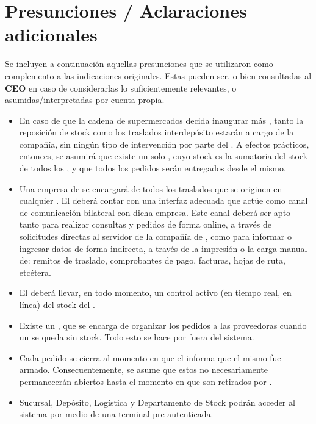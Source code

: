 
\section{Presunciones / Aclaraciones adicionales}

Se incluyen a continuación aquellas presunciones que se utilizaron como
complemento a las indicaciones originales. Estas pueden ser, o bien consultadas
al \textbf{CEO} en caso de considerarlas lo suficientemente relevantes, o
asumidas/interpretadas por cuenta propia.

\begin{itemize}

  \item En caso de que la cadena de supermercados decida inaugurar más
\textbf{}, tanto la reposición de stock como los traslados
interdepósito estarán a cargo de la compañía, sin ningún tipo de intervención
por parte del \textbf{}. A efectos prácticos, entonces, se asumirá
que existe un solo \textbf{}, cuyo stock es la sumatoria del stock
de todos los \textbf{}, y que todos los pedidos serán entregados
desde el mismo.

  \item Una empresa de \textbf{} se encargará de todos los
traslados que se originen en cualquier \textbf{}. El
\textbf{} deberá contar con una interfaz adecuada que actúe como
canal de comunicación bilateral con dicha empresa. Este canal deberá ser apto
tanto para realizar consultas y pedidos de forma online, a través de solicitudes
directas al servidor de la compañía de \textbf{}, como para
informar o ingresar datos de forma indirecta, a través de la impresión o la
carga manual de: remitos de traslado, comprobantes de pago, facturas, hojas de
ruta, etcétera.

  \item El \textbf{} deberá llevar, en todo momento, un control
activo (en tiempo real, en línea) del stock del \textbf{}.

  \item Existe un \textbf{}, que se encarga de
organizar los pedidos a las proveedoras cuando un \textbf{} se
queda sin stock. Todo esto se hace por fuera del sistema.

  \item Cada pedido se cierra al momento en que el \textbf{}
informa que el mismo fue armado. Consecuentemente, se asume que estos no
necesariamente permanecerán abiertos hasta el momento en que son retirados por
\textbf{}.

  \item Sucursal, Depósito, Logística y Departamento de Stock podrán acceder
    al sistema por medio de una terminal pre-autenticada.

\end{itemize}
